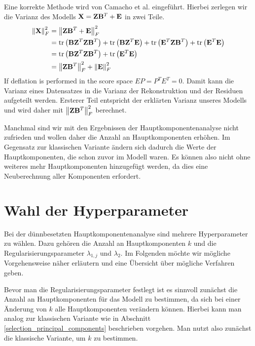 Eine korrekte Methode wird von Camacho et al. eingeführt. Hierbei zerlegen wir die Varianz des Modells $\mathbf{X} = \mathbf{Z} \mathbf{B}^T + \mathbf{E}$ in zwei Teile.
\begin{align}
\label{camacho_explained_variance}
\left\lVert \mathbf{X} \right\rVert_F^2 & = \left\lVert \mathbf{Z} \mathbf{B}^T + \mathbf{E} \right\rVert_{F}^{2} \nonumber\\
& = \text{tr} \left( \mathbf{B} \mathbf{Z}^T \mathbf{Z} \mathbf{B}^T \right) + \text{tr} \left( \mathbf{B} \mathbf{Z}^T \mathbf{E} \right) + \text{tr} \left( \mathbf{E}^T\mathbf{Z} \mathbf{B}^T \right) + \text{tr} \left( \mathbf{E}^T \mathbf{E} \right) \nonumber\\
& = \text{tr} \left( \mathbf{B} \mathbf{Z}^T \mathbf{Z} \mathbf{B}^T \right) + \text{tr} \left( \mathbf{E}^T \mathbf{E} \right) \nonumber\\
& = \left\lVert \mathbf{Z} \mathbf{B}^T \right\rVert_{F}^{2} + \left\lVert \mathbf{E} \right\rVert_{F}^{2}
\end{align}
If deflation is performed in the score space $EP = P^T E^T = 0$.
Damit kann die Varianz eines Datensatzes in die Varianz der Rekonstruktion und der Residuen aufgeteilt werden. Ersterer Teil entspricht der erklärten Varianz unseres Modells und wird daher mit $\left\lVert \mathbf{Z} \mathbf{B}^T \right\rVert_{F}^{2}$ berechnet.

Manchmal sind wir mit den Ergebnissen der Hauptkomponentenanalyse nicht zufrieden und wollen daher die Anzahl an Hauptkomponenten erhöhen. Im Gegensatz zur klassischen Variante ändern sich dadurch die Werte der Hauptkomponenten, die schon zuvor im Modell waren. Es können also nicht ohne weiteres mehr Hauptkomponenten hinzugefügt werden, da dies eine Neuberechnung aller Komponenten erfordert.



\section{Wahl der Hyperparameter}
\label{choice_of_tuning_parameters}

Bei der dünnbesetzten Hauptkomponentenanalyse sind mehrere Hyperparameter zu wählen. Dazu gehören die Anzahl an Hauptkomponenten $k$ und die Regularisierungsparameter $\lambda_{1,j}$ und $\lambda_2$. Im Folgenden möchte wir mögliche Vorgehensweise näher erläutern und eine Übersicht über mögliche Verfahren geben. 

Bevor man die Regularisierungsparameter festlegt ist es sinnvoll zunächst die Anzahl an Hauptkomponenten für das Modell zu bestimmen, da sich bei einer Änderung von $k$ alle Hauptkomponenten verändern können. Hierbei kann man analog zur klassischen Variante wie in Abschnitt \ref{selection_principal_components} beschrieben vorgehen. Man nutzt also zunächst die klassische Variante, um $k$ zu bestimmen.


